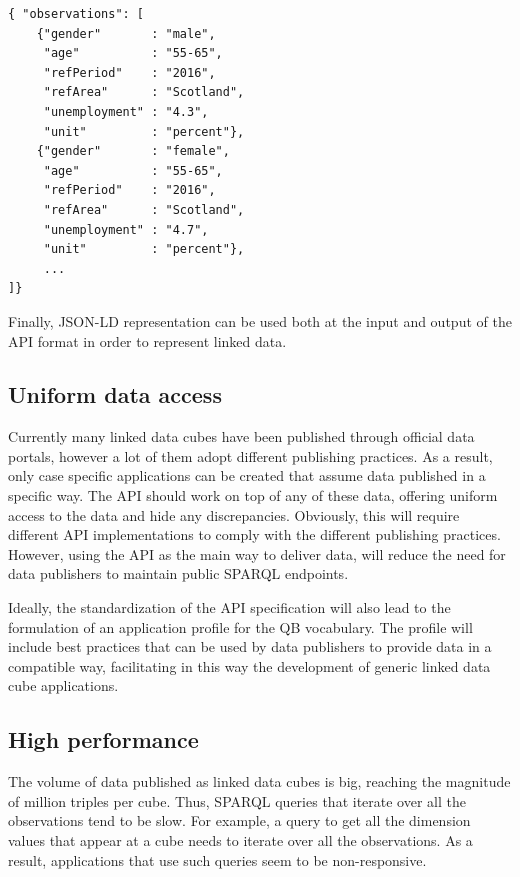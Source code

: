 \documentclass{llncs}
\begin{document}
\begin{verbatim} 
{ "observations": [ 
    {"gender"       : "male", 
     "age"          : "55-65", 
     "refPeriod"    : "2016",
     "refArea"      : "Scotland",
     "unemployment" : "4.3",
     "unit"         : "percent"}, 
    {"gender"       : "female", 
     "age"          : "55-65", 
     "refPeriod"    : "2016",
     "refArea"      : "Scotland",
     "unemployment" : "4.7",
     "unit"         : "percent"},
     ...
]}
\end{verbatim}

Finally, JSON-LD representation can be used both at the input and output of the API format in order to represent linked data.

\subsection{Uniform data access}

Currently many linked data cubes have been published through official data portals, however a lot of them adopt different publishing practices. As a result, only case specific applications can be created that assume data published in a specific way. The API should work on top of any of these data, offering uniform access to the data and hide any discrepancies. Obviously, this will require different API implementations to comply with the different publishing practices. However, using the API as the main way to deliver data, will reduce the need for data publishers to maintain public SPARQL endpoints.

Ideally, the standardization of the API specification will also lead to the formulation of an application profile for the QB vocabulary. The profile will include best practices that can be used by data publishers to provide data in a compatible way, facilitating in this way the development of generic linked data cube applications.

\subsection{High performance}

The volume of data published as linked data cubes is big, reaching the magnitude of million triples per cube. Thus, SPARQL queries that iterate over all the observations tend to be slow. For example, a query to get all the dimension values that appear at a cube needs to iterate over all the observations. As a result, applications that use such queries seem to be non-responsive. 
\end{document}
